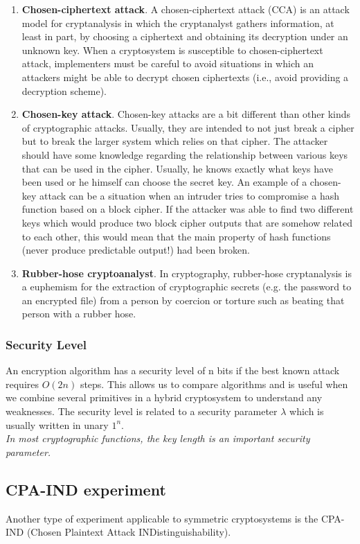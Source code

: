\documentclass{article}
\begin{document}
\begin{enumerate}
    \item \textbf{Chosen-ciphertext attack}. A chosen-ciphertext attack (CCA) is an attack model for cryptanalysis in which the cryptanalyst gathers information, at least in part, by choosing a ciphertext and obtaining its decryption under an unknown key.
    When a cryptosystem is susceptible to chosen-ciphertext attack, implementers must be careful to avoid situations in which an attackers might be able to decrypt chosen ciphertexts (i.e., avoid providing a decryption scheme).
    \item \textbf{Chosen-key attack}. Chosen-key attacks are a bit different than other kinds of cryptographic attacks. Usually, they are intended to not just break a cipher but to break the larger system which relies on that cipher.
    The attacker should have some knowledge regarding the relationship between various keys that can be used in the cipher. Usually, he knows exactly what keys have been used or he himself can choose the secret key.
    An example of a chosen-key attack can be a situation when an intruder tries to compromise a hash function based on a block cipher. If the attacker was able to find two different keys which would produce two block cipher outputs that are somehow related to each other, this would mean that the main property of hash functions (never produce predictable output!) had been broken.
    \item \textbf{Rubber-hose cryptoanalyst}. In cryptography, rubber-hose cryptanalysis is a euphemism for the extraction of cryptographic secrets (e.g. the password to an encrypted file) from a person by coercion or torture such as beating that person with a rubber hose.
\end{enumerate}

\subsubsection{Security Level}
An encryption algorithm has a security level of n bits if the best known attack requires $O(2n)$ steps. This allows us to compare algorithms and is useful when we combine several primitives in a hybrid cryptosystem to understand any weaknesses. The security level is related to a security parameter $\lambda$ which is usually written in unary $1^n$.\\
\textit{In most cryptographic functions, the key length is an important
security parameter.}


\subsection{CPA-IND experiment}
Another type of experiment applicable to symmetric cryptosystems is the CPA-IND (Chosen Plaintext Attack INDistinguishability).
\end{document}
